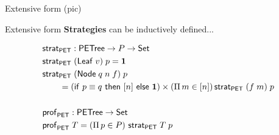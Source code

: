 \begin{framecard}
	{\color{colorbg}
	\bfseries

	}
\end{framecard}

\begin{frame}{Extensive form}
	(pic)

\end{frame}

\begin{frame}{Extensive form}
	\textbf{\textcolor{coloragents}{Strategies}} can be inductively defined...

	\begin{minipage}[c]{\textwidth}
		\begin{minipage}[c]{.47\textwidth}

		\end{minipage}
		\begin{minipage}[c]{.47\textwidth}
			\begin{align*}
				& \strategies_\PET : \PETree \to P \to \mathsf{Set} \\
				& \strategies_\PET \; (\Leaf \; v)\; p = \One \\
				& \strategies_\PET \; (\Node \; q \; n \; f)\; p\\
				& \qquad = (\mathsf{if}\ p \equiv q\ \mathsf{then}\ [n]\ \mathsf{else}\ \One) \times (\Pi\,{m \in [n]})\, \strategies_\PET\; (f\; m)\; p\\
				&\\
				& \profiles_\PET : \PETree \to \mathsf{Set}\\
				& \profiles_\PET\; T = (\Pi\,p \in P)\ \strategies_\PET\; T\; p
			\end{align*}
		\end{minipage}
	\end{minipage}
\end{frame}


